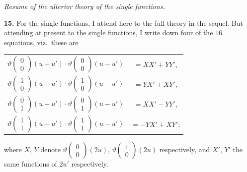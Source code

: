 \documentclass[11pt,a4paper]{book}
\begin{document}
\vspace{1em}

\begin{center}
\textit{Resume of the ulterior theory of the single functions.}
\end{center}

\vspace{0.5em}

\noindent\textbf{15.}\quad
For the single functions, I attend here to the full theory in the sequel. But attending at present to the single functions, I write down four of the $16$ equations, viz.\ these are

\begin{center}
\begin{tabular}{c@{\qquad}c}
$\vartheta\begin{pmatrix} 0 \\ 0 \end{pmatrix}(u + u') \cdot \vartheta\begin{pmatrix} 0 \\ 0 \end{pmatrix}(u - u')$ & $= XX' + YY'$, \\
$\vartheta\begin{pmatrix} 1 \\ 0 \end{pmatrix}(u + u') \cdot \vartheta\begin{pmatrix} 1 \\ 0 \end{pmatrix}(u - u')$ & $= YX' + XY'$, \\
$\vartheta\begin{pmatrix} 0 \\ 1 \end{pmatrix}(u + u') \cdot \vartheta\begin{pmatrix} 0 \\ 1 \end{pmatrix}(u - u')$ & $= XX' - YY'$, \\
$\vartheta\begin{pmatrix} 1 \\ 1 \end{pmatrix}(u + u') \cdot \vartheta\begin{pmatrix} 1 \\ 1 \end{pmatrix}(u - u')$ & $= -YX' + XY'$;
\end{tabular}
\end{center}

\noindent where $X$, $Y$ denote $\vartheta\begin{pmatrix} 0 \\ 0 \end{pmatrix}(2u)$, $\vartheta\begin{pmatrix} 1 \\ 0 \end{pmatrix}(2u)$ respectively, and $X'$, $Y'$ the same functions of $2u'$ respectively.
\end{document}
